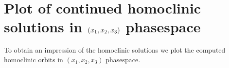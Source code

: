 \documentclass[letterpaper,10pt,english]{jupyterBook}
\begin{document}
\begin{sphinxVerbatim}[commandchars=\\\{\}]
\end{sphinxVerbatim}

\noindent{}


\section{Plot of continued homoclinic solutions in \protect\((x_1,x_2,x_3)\protect\) phase\sphinxhyphen{}space}
\label{\detokenize{IFOC:plot-of-continued-homoclinic-solutions-in-x-1-x-2-x-3-phase-space}}
\sphinxAtStartPar
To obtain an impression of the  homoclinic solutions we plot the computed
homoclinic orbits in \((x_1,x_2,x_3)\) phase\sphinxhyphen{}space.
\end{document}
